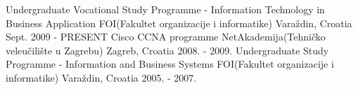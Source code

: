 \begin{cventries}
  \cventry
    {Undergraduate Vocational Study Programme - Information Technology in Business Application}
    {FOI(Fakultet organizacije i informatike)}
    {Varaždin, Croatia}
    {Sept. 2009 - PRESENT}
    {}
    \cventry
    {Cisco CCNA programme}
    {NetAkademija(Tehničko veleučilište u Zagrebu)}
    {Zagreb, Croatia}
    {2008. - 2009.}
    {}
      \cventry
    {Undergraduate Study Programme - Information and Business Systems}
    {FOI(Fakultet organizacije i informatike)}
    {Varaždin, Croatia}
    {2005. - 2007.}{}
\end{cventries}

